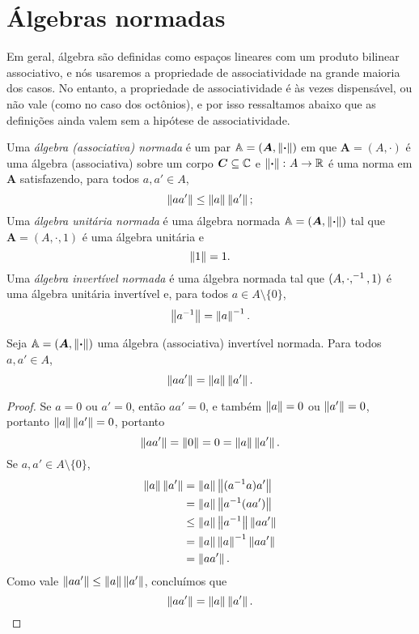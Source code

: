 \section{Álgebras normadas}

Em geral, álgebra são definidas como espaços lineares com um produto bilinear associativo, e nós usaremos a propriedade de associatividade na grande maioria dos casos. No entanto, a propriedade de associatividade é às vezes dispensável, ou não vale (como no caso dos octônios), e por isso ressaltamos abaixo que as definições ainda valem sem a hipótese de associatividade.

\begin{definition}
Uma \emph{álgebra (associativa) normada} é um par $\mathbb A = (\bm A,\left\Vert{\bm{\cdot}}\right\Vert)$ em que $\bm A = (A,\cdot)$ é uma álgebra (associativa) sobre um corpo $\bm C \subseteq \mathbb{C}$ e $\left\Vert{\bm{\cdot}}\right\Vert\colon A \to \mathbb{R}$ é uma norma em $\bm A$ satisfazendo, para todos $a,a' \in A$,
	\begin{equation*}
	\left\Vert{aa'}\right\Vert \leq \left\Vert{a}\right\Vert\left\Vert{a'}\right\Vert;
	\end{equation*}
Uma \emph{álgebra unitária normada} é uma álgebra normada $\mathbb A = (\bm A,\left\Vert{\bm{\cdot}}\right\Vert)$ tal que $\bm A = (A,\cdot,1)$ é uma álgebra unitária e
	\begin{equation*}
	\left\Vert{1}\right\Vert = 1.
	\end{equation*}
Uma \emph{álgebra invertível normada} é uma álgebra normada tal que $(A,\cdot,^{-1},1)$ é uma álgebra unitária invertível e, para todos $a \in A \setminus \{0\}$,
	\begin{equation*}
	\left\Vert{a^{-1}}\right\Vert = \left\Vert{a}\right\Vert^{-1}.
	\end{equation*}
\end{definition}

\begin{exercise}
Seja $\mathbb A = (\bm A,\left\Vert{\bm{\cdot}}\right\Vert)$ uma álgebra (associativa) invertível normada. Para todos $a,a' \in A$,
	\begin{equation*}
	\left\Vert{aa'}\right\Vert = \left\Vert{a}\right\Vert\left\Vert{a'}\right\Vert.
	\end{equation*}
\end{exercise}
\begin{proof}
Se $a=0$ ou $a'=0$, então $aa' = 0$, e também $\left\Vert{a}\right\Vert=0$ ou $\left\Vert{a'}\right\Vert=0$, portanto $\left\Vert{a}\right\Vert\left\Vert{a'}\right\Vert=0$, portanto
	\begin{equation*}
	\left\Vert{aa'}\right\Vert = \left\Vert{0}\right\Vert = 0 = \left\Vert{a}\right\Vert\left\Vert{a'}\right\Vert.
	\end{equation*}
Se $a,a' \in A \setminus \{0\}$,
	\begin{align*}
	\left\Vert{a}\right\Vert\left\Vert{a'}\right\Vert &= \left\Vert{a}\right\Vert\left\Vert{(a^{-1}a)a'}\right\Vert \\
		&= \left\Vert{a}\right\Vert\left\Vert{a^{-1}(aa')}\right\Vert \\
		&\leq \left\Vert{a}\right\Vert\left\Vert{a^{-1}}\right\Vert \left\Vert{aa'}\right\Vert \\
		&= \left\Vert{a}\right\Vert\left\Vert{a}\right\Vert^{-1} \left\Vert{aa'}\right\Vert \\
		&= \left\Vert{aa'}\right\Vert.
	\end{align*}
Como vale $\left\Vert{aa'}\right\Vert \leq \left\Vert{a}\right\Vert\left\Vert{a'}\right\Vert$, concluímos que
	\begin{equation*}
	\left\Vert{aa'}\right\Vert = \left\Vert{a}\right\Vert\left\Vert{a'}\right\Vert.
	\qedhere
	\end{equation*}
\end{proof}



